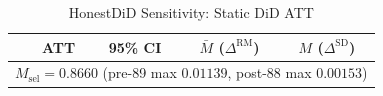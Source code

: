 \begin{table}[htbp]\centering
\caption{HonestDiD Sensitivity: Static DiD ATT}
\label{tbl:sa_honestdid_static}
\begin{tabular}{lcccc}\toprule
 & ATT & 95\% CI & $\bar{M}$ ($\Delta^{\mathrm{RM}}$) & $M$ ($\Delta^{\mathrm{SD}}$) \\
\midrule
\midrule
\multicolumn{5}{l}{$M_{\mathrm{sel}}=0.8660$ (pre-89 max $0.01139$, post-88 max $0.00153$)} \\
\bottomrule\end{tabular}
\end{table}
